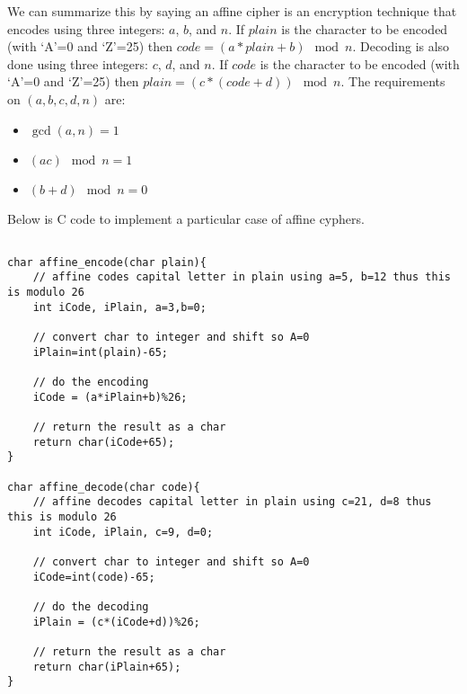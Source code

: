 We can summarize this by saying an affine cipher is an encryption technique that encodes using three integers: $a$, $b$, and $n$.  If $plain$ is the character to be encoded (with `A'=0 and `Z'=25) then $code=(a*plain+b) \mod n$.  Decoding is also done using three integers: $c$, $d$, and $n$.  If $code$ is the character to be encoded (with `A'=0 and `Z'=25) then $plain=(c*(code+d)) \mod n$.  The requirements on $(a,b,c,d,n)$ are:
\begin{itemize}
    \item $\gcd(a,n)=1$
    \item $(ac) \mod n = 1$
    \item $(b+d) \mod n = 0$
\end{itemize}
Below is C code to implement a particular case of affine cyphers.
\begin{verbatim}

char affine_encode(char plain){
    // affine codes capital letter in plain using a=5, b=12 thus this is modulo 26
    int iCode, iPlain, a=3,b=0;

    // convert char to integer and shift so A=0
    iPlain=int(plain)-65;

    // do the encoding
    iCode = (a*iPlain+b)%26;

    // return the result as a char
    return char(iCode+65);
}

char affine_decode(char code){
    // affine decodes capital letter in plain using c=21, d=8 thus this is modulo 26
    int iCode, iPlain, c=9, d=0;

    // convert char to integer and shift so A=0
    iCode=int(code)-65;

    // do the decoding
    iPlain = (c*(iCode+d))%26;

    // return the result as a char
    return char(iPlain+65);
}
\end{verbatim} 